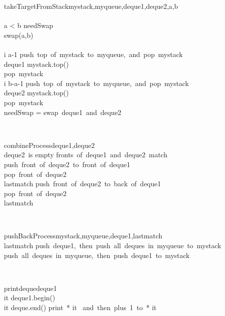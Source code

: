 \documentclass[12pt]{article}
\begin{document}
\begin{pseudocode}[ruled]{takeTargetFromStack}{mystack,myqueue,deque1,deque2,a,b}
  \\
  \\
  \IF a < b \THEN
  \BEGIN
    needSwap \GETS \TRUE\\
    swap(a,b)\\
  \END\\
  \FOR i  \TO a-1 \DO
    \mbox{push top of mystack to myqueue, and pop mystack}\\
  deque1 \GETS mystack.top()\\
  \mbox{pop mystack}\\
  \FOR i  \TO b-a-1 \DO
    \mbox{push top of mystack to myqueue, and pop mystack}\\
  deque2 \GETS mystack.top()\\
  \mbox{pop mystack}\\
  \IF needSwap = \TRUE \THEN
  \mbox{swap deque1 and deque2}
\end{pseudocode}\\
\begin{pseudocode}[ruled]{combineProcess}{deque1,deque2}
  \\
  \WHILE \mbox{deque2 is} \NOT \mbox{empty} \DO
  \BEGIN
    \IF \mbox{fronts of deque1 and deque2 match} \THEN
    \BEGIN
      \mbox{push front of deque2 to front of deque1}\\
      \mbox{pop front of deque2}\\
      lastmatch \GETS \TRUE
    \END
    \ELSE
    \BEGIN
      \mbox{push front of deque2 to back of deque1}\\
      \mbox{pop front of deque2}\\
      lastmatch \GETS \FALSE
    \END
  \END\\
\end{pseudocode}\\
\begin{pseudocode}[ruled]{pushBackProcess}{mystack,myqueue,deque1,lastmatch}
  \\
  \IF lastmatch \THEN
    \mbox{push deque1, then push all deques in myqueue to mystack}
  \ELSE
    \mbox{push all deques in myqueue, then push deque1 to mystack}
\end{pseudocode}\\
\begin{pseudocode}[ruled]{printdeque}{deque1}
  \\
  it \GETS deque1.begin()\\
  \WHILE it \ne deque.end() \DO
    \mbox{print *} it \mbox{ and then plus 1 to *} it
\end{pseudocode}\\
\end{document}
